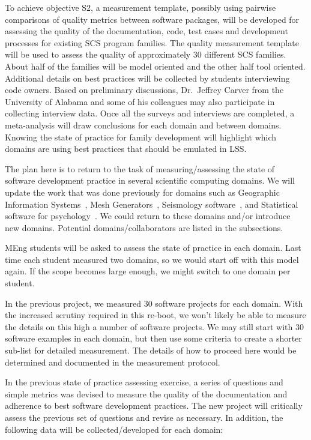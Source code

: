 \documentclass[12pt]{article}
\begin{document}
To achieve objective S2, a measurement template, possibly using pairwise
comparisons of quality metrics between software packages, will be developed for
assessing the quality of the documentation, code, test cases and development
processes for existing SCS program families.  The quality measurement template
will be used to assess the quality of approximately 30 different SCS families.
About half of the families will be model oriented and the other half tool
oriented.  Additional details on best practices will be collected by students
interviewing code owners.  Based on preliminary discussions, Dr.\ Jeffrey Carver
from the University of Alabama and some of his colleagues may also participate
in collecting interview data. Once all the surveys and interviews are
completed, a meta-analysis will draw conclusions for each domain and between
domains.  Knowing the state of practice for family development will highlight
which domains are using best practices that should be emulated in LSS.

The plan here is to return to the task of measuring/assessing the state of
software development practice in several scientific computing domains.  We will
update the work that was done previously for domains such as Geographic
Information Systems~\cite{SmithEtAl2018_arXivGIS}, Mesh
Generators~\cite{SmithEtAl2016}, Seismology software~\cite{SmithEtAl2018}, and
Statistical software for psychology~\cite{SmithEtAl2018_StatSoft}.  We could
return to these domains and/or introduce new domains.  Potential domains/collaborators
are listed in the subsections.

MEng students will be asked to assess the state of practice in each domain.
Last time each student measured two domains, so we would start off with this
model again.  If the scope becomes large enough, we might switch to one domain
per student.

In the previous project, we measured 30 software projects for each domain.  With
the increased scrutiny required in this re-boot, we won't likely be able to
measure the details on this high a number of software projects.  We may still
start with 30 software examples in each domain, but then use some criteria to
create a shorter sub-list for detailed measurement.  The details of how to
proceed here would be determined and documented in the measurement protocol.

In the previous state of practice assessing exercise, a series of questions and
simple metrics was devised to measure the quality of the documentation and
adherence to best software development practices.  The new project will
critically assess the previous set of questions and revise as necessary.  In
addition, the following data will be collected/developed for each domain:
\end{document}
